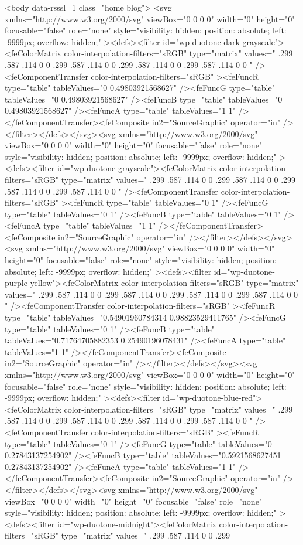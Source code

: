 {	<body data-rsssl=1 class="home blog">
		<svg xmlns="http://www.w3.org/2000/svg" viewBox="0 0 0 0" width="0" height="0" focusable="false" role="none" style="visibility: hidden; position: absolute; left: -9999px; overflow: hidden;" ><defs><filter id="wp-duotone-dark-grayscale"><feColorMatrix color-interpolation-filters="sRGB" type="matrix" values=" .299 .587 .114 0 0 .299 .587 .114 0 0 .299 .587 .114 0 0 .299 .587 .114 0 0 " /><feComponentTransfer color-interpolation-filters="sRGB" ><feFuncR type="table" tableValues="0 0.49803921568627" /><feFuncG type="table" tableValues="0 0.49803921568627" /><feFuncB type="table" tableValues="0 0.49803921568627" /><feFuncA type="table" tableValues="1 1" /></feComponentTransfer><feComposite in2="SourceGraphic" operator="in" /></filter></defs></svg><svg xmlns="http://www.w3.org/2000/svg" viewBox="0 0 0 0" width="0" height="0" focusable="false" role="none" style="visibility: hidden; position: absolute; left: -9999px; overflow: hidden;" ><defs><filter id="wp-duotone-grayscale"><feColorMatrix color-interpolation-filters="sRGB" type="matrix" values=" .299 .587 .114 0 0 .299 .587 .114 0 0 .299 .587 .114 0 0 .299 .587 .114 0 0 " /><feComponentTransfer color-interpolation-filters="sRGB" ><feFuncR type="table" tableValues="0 1" /><feFuncG type="table" tableValues="0 1" /><feFuncB type="table" tableValues="0 1" /><feFuncA type="table" tableValues="1 1" /></feComponentTransfer><feComposite in2="SourceGraphic" operator="in" /></filter></defs></svg><svg xmlns="http://www.w3.org/2000/svg" viewBox="0 0 0 0" width="0" height="0" focusable="false" role="none" style="visibility: hidden; position: absolute; left: -9999px; overflow: hidden;" ><defs><filter id="wp-duotone-purple-yellow"><feColorMatrix color-interpolation-filters="sRGB" type="matrix" values=" .299 .587 .114 0 0 .299 .587 .114 0 0 .299 .587 .114 0 0 .299 .587 .114 0 0 " /><feComponentTransfer color-interpolation-filters="sRGB" ><feFuncR type="table" tableValues="0.54901960784314 0.98823529411765" /><feFuncG type="table" tableValues="0 1" /><feFuncB type="table" tableValues="0.71764705882353 0.25490196078431" /><feFuncA type="table" tableValues="1 1" /></feComponentTransfer><feComposite in2="SourceGraphic" operator="in" /></filter></defs></svg><svg xmlns="http://www.w3.org/2000/svg" viewBox="0 0 0 0" width="0" height="0" focusable="false" role="none" style="visibility: hidden; position: absolute; left: -9999px; overflow: hidden;" ><defs><filter id="wp-duotone-blue-red"><feColorMatrix color-interpolation-filters="sRGB" type="matrix" values=" .299 .587 .114 0 0 .299 .587 .114 0 0 .299 .587 .114 0 0 .299 .587 .114 0 0 " /><feComponentTransfer color-interpolation-filters="sRGB" ><feFuncR type="table" tableValues="0 1" /><feFuncG type="table" tableValues="0 0.27843137254902" /><feFuncB type="table" tableValues="0.5921568627451 0.27843137254902" /><feFuncA type="table" tableValues="1 1" /></feComponentTransfer><feComposite in2="SourceGraphic" operator="in" /></filter></defs></svg><svg xmlns="http://www.w3.org/2000/svg" viewBox="0 0 0 0" width="0" height="0" focusable="false" role="none" style="visibility: hidden; position: absolute; left: -9999px; overflow: hidden;" ><defs><filter id="wp-duotone-midnight"><feColorMatrix color-interpolation-filters="sRGB" type="matrix" values=" .299 .587 .114 0 0 .299 }
